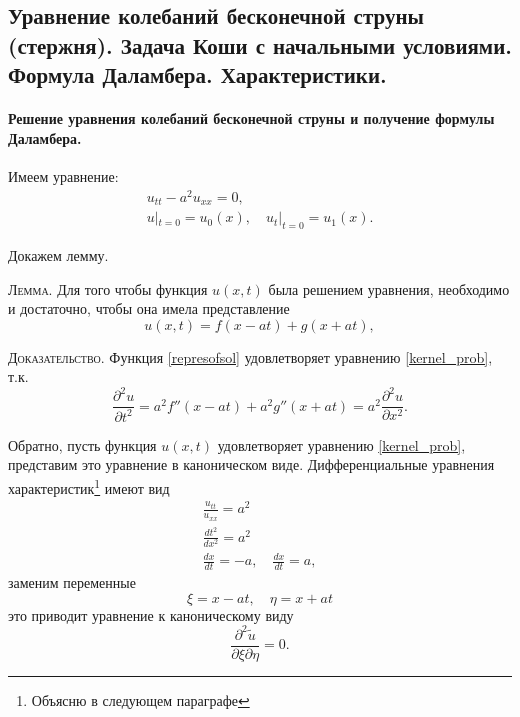 \subsection{Уравнение колебаний бесконечной струны (стержня). Задача Коши с начальными условиями. Формула Даламбера. Характеристики.}
\label{DalamberFormula}



\paragraph{Решение уравнения колебаний бесконечной струны и получение формулы Даламбера.}
Имеем уравнение:
\begin{gather}
	u_{tt} - a^2 u_{xx} = 0, \label{kernel_prob} \\
	u |_{t = 0} = u_0(x), \quad u_t|_{t = 0} = u_1(x).
\end{gather}

Докажем лемму.

\textsc{Лемма.} Для того чтобы функция $u(x, t)$ была решением уравнения, необходимо и достаточно, чтобы она имела представление 
\begin{equation} \label{represofsol}
	u(x, t) = f(x - at) + g(x + at),
\end{equation}

\textsc{Доказательство.} Функция \eqref{represofsol} удовлетворяет уравнению \eqref{kernel_prob}, т.к. 
\begin{equation*}
	\frac{\partial^2 u}{\partial t^2} = a^2 f''(x - at) + a^2 g''(x + at) = a^2 \frac{\partial^2 u}{\partial x^2}.
\end{equation*}

Обратно, пусть функция $u(x, t)$ удовлетворяет уравнению \eqref{kernel_prob}, представим это уравнение в каноническом виде. Дифференциальные уравнения характеристик\footnote{Объясню в следующем параграфе} имеют вид 
\begin{gather*}
	\frac{u_{tt}}{u_{xx}} = a^2 \\
	\frac{d t^2}{d x^2} = a^2 \\
	\frac{dx}{dt} = - a, \quad \frac{dx}{dt} = a,
\end{gather*}
заменим переменные
\begin{equation*}
	\xi = x - a t, \quad \eta = x + a t
\end{equation*}
это приводит уравнение к каноническому виду
\begin{equation*}
	\frac{\partial^2 \tilde{u}}{\partial \xi \partial \eta} = 0.
\end{equation*}

